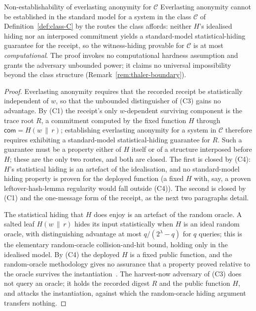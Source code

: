 \begin{impossibilitybox}{Non-establishability of everlasting anonymity for $\mathcal C$}\label{thm:no-everlasting}
    Everlasting anonymity cannot be established in the standard model for a system in the class $\mathcal C$ of Definition~\ref{def:class-C} by the routes the class affords: neither $H$'s idealised hiding nor an interposed commitment yields a standard-model statistical-hiding guarantee for the receipt, so the witness-hiding provable for $\mathcal C$ is at most \emph{computational}. The proof invokes no computational hardness assumption and grants the adversary unbounded power; it claims no universal impossibility beyond the class structure (Remark~\ref{rem:thaler-boundary}).
\end{impossibilitybox}

\begin{proof}
    Everlasting anonymity requires that the recorded receipt be statistically independent of $w$, so that the unbounded distinguisher of (C3) gains no advantage. By (C1) the receipt's only $w$-dependent surviving component is the trace root $R$, a commitment computed by the fixed function $H$ through $\mathsf{com}=H(w\,\|\,r)$; establishing everlasting anonymity for a system in $\mathcal C$ therefore requires exhibiting a standard-model statistical-hiding guarantee for $R$. Such a guarantee must be a property either of $H$ itself or of a structure interposed before $H$; these are the only two routes, and both are closed. The first is closed by (C4): $H$'s statistical hiding is an artefact of the idealisation, and no standard-model hiding property is proven for the deployed function (a fixed $H$ with, say, a proven leftover-hash-lemma regularity would fall outside (C4)). The second is closed by (C1) and the one-message form of the receipt, as the next two paragraphs detail.
    
    The statistical hiding that $H$ does enjoy is an artefact of the random oracle. A salted leaf $H(w\,\|\,r)$ hides its input statistically when $H$ is an ideal random oracle, with distinguishing advantage at most $q/(2^\lambda-q)$ for $q$ queries; this is the elementary random-oracle collision-and-hit bound, holding only in the idealised model. By (C4) the deployed $H$ is a fixed public function, and the random-oracle methodology gives no assurance that a property proved relative to the oracle survives the instantiation~\cite{cgh2004rom}. The harvest-now adversary of (C3) does not query an oracle; it holds the recorded digest $R$ and the public function $H$, and attacks the instantiation, against which the random-oracle hiding argument transfers nothing.
    

\end{proof}
